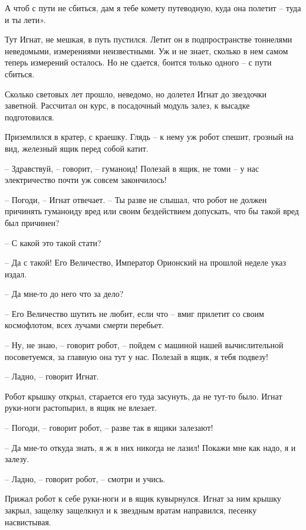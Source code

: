 \documentclass[ebook,oneside,final,openright]{memoir}
\begin{document}
А чтоб с пути не сбиться, дам я тебе комету путеводную, куда она полетит – туда и ты лети».\par
\par
Тут Игнат, не мешкая, в путь пустился. Летит он в подпространстве тоннелями неведомыми, измерениями неизвестными. Уж и не знает, сколько в нем самом теперь измерений осталось. Но не сдается, боится только одного – с пути сбиться.\par
\par
Сколько световых лет прошло, неведомо, но долетел Игнат до звездочки заветной. Рассчитал он курс, в посадочный модуль залез, к высадке подготовился.\par
\par
Приземлился в кратер, с краешку. Глядь – к нему уж робот спешит, грозный на вид, железный ящик перед собой катит.\par
– Здравствуй, – говорит, – гуманоид! Полезай в ящик, не томи – у нас электричество почти уж совсем закончилось!\par
– Погоди, – Игнат отвечает. – Ты разве не слышал, что робот не должен причинять гуманоиду вред или своим бездействием допускать, что бы такой вред был причинен?\par
– С какой это такой стати?\par
– Да с такой! Его Величество, Император Орионский на прошлой неделе указ издал.\par
– Да мне-то до него что за дело?\par
– Его Величество шутить не любит, если что – вмиг прилетит со своим космофлотом, всех лучами смерти перебьет.\par
– Ну, не знаю, – говорит робот, – пойдем с машиной нашей вычислительной посоветуемся, за главную она тут у нас. Полезай в ящик, я тебя подвезу!\par
– Ладно, – говорит Игнат.\par
Робот крышку открыл, старается его туда засунуть, да не тут-то было. Игнат руки-ноги растопырил, в ящик не влезает. \par
– Погоди, – говорит робот, – разве так в ящики залезают! \par
– Да мне-то откуда знать, я ж в них никогда не лазил! Покажи мне как надо, я и залезу. \par
– Ладно, – говорит робот, – смотри и учись. \par
Прижал робот к себе руки-ноги и в ящик кувырнулся. Игнат за ним крышку закрыл, защелку защелкнул и к звездным вратам направился, песенку насвистывая.\par
\end{document}
